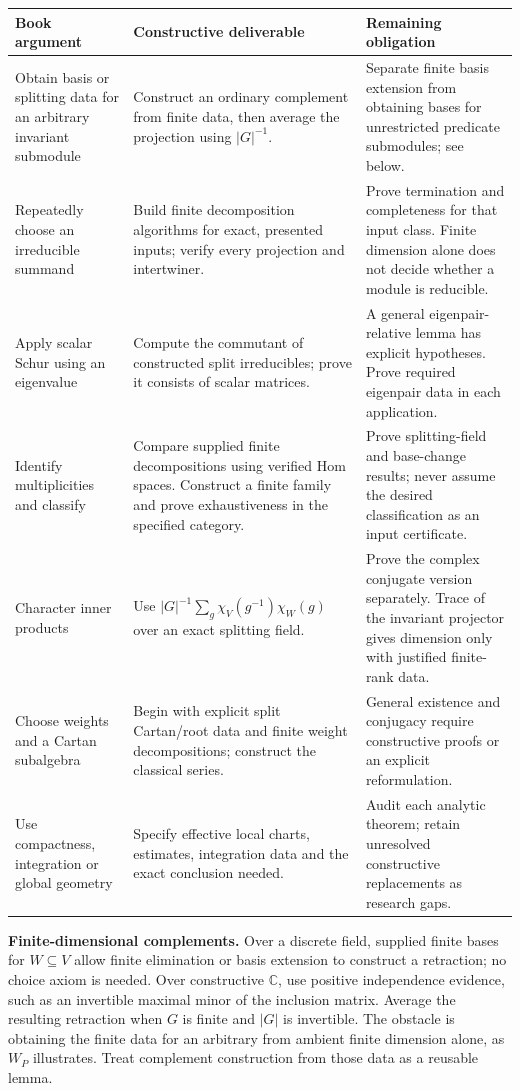 \documentclass[11pt,a4paper]{article}
\newcommand{\code}[1]{\texttt{\detokenize{#1}}}
\newcommand{\C}{\mathbb C}
\begin{document}
{\small
\begin{tabularx}{\linewidth}{@{}P{35mm}YY@{}}
\toprule
Book argument & Constructive deliverable & Remaining obligation \\
\midrule
Obtain basis or splitting data for an arbitrary invariant submodule & Construct an ordinary complement from finite data, then average the projection using $|G|^{-1}$. & Separate finite basis extension from obtaining bases for unrestricted predicate submodules; see below. \\
Repeatedly choose an irreducible summand & Build finite decomposition algorithms for exact, presented inputs; verify every projection and intertwiner. & Prove termination and completeness for that input class. Finite dimension alone does not decide whether a module is reducible. \\
Apply scalar Schur using an eigenvalue & Compute the commutant of constructed split irreducibles; prove it consists of scalar matrices. & A general eigenpair-relative lemma has explicit hypotheses. Prove required eigenpair data in each application. \\
Identify multiplicities and classify & Compare supplied finite decompositions using verified Hom spaces. Construct a finite family and prove exhaustiveness in the specified category. & Prove splitting-field and base-change results; never assume the desired classification as an input certificate. \\
Character inner products & Use $|G|^{-1}\sum_g\chi_V(g^{-1})\chi_W(g)$ over an exact splitting field. & Prove the complex conjugate version separately. Trace of the invariant projector gives dimension only with justified finite-rank data. \\
Choose weights and a Cartan subalgebra & Begin with explicit split Cartan/root data and finite weight decompositions; construct the classical series. & General existence and conjugacy require constructive proofs or an explicit reformulation. \\
Use compactness, integration or global geometry & Specify effective local charts, estimates, integration data and the exact conclusion needed. & Audit each analytic theorem; retain unresolved constructive replacements as research gaps. \\
\bottomrule
\end{tabularx}}

\textbf{Finite-dimensional complements.} Over a discrete field, supplied
finite bases for $W\subseteq V$ allow finite elimination or basis extension
to construct a retraction; no choice axiom is needed. Over constructive
$\C$, use positive independence evidence, such as an invertible maximal minor
of the inclusion matrix. Average the resulting retraction when $G$ is finite
and $|G|$ is invertible. The obstacle is obtaining the finite data for an
arbitrary \code{SubLRepres} from ambient finite dimension alone, as $W_P$
illustrates. Treat complement construction from those data as a reusable lemma.
\end{document}
